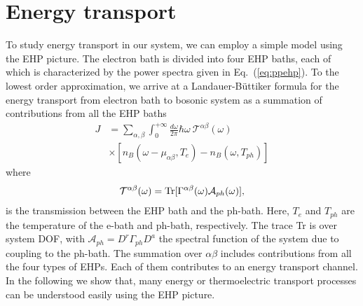 \documentclass[aps
,floatfix,footinbib,
preprint
]{revtex4-1}
\begin{document}
\section{Energy transport}
To study energy transport in our system, we can employ a simple model using the EHP picture. The electron bath is divided into four EHP baths, each of which is characterized by the power spectra given in Eq.~(\ref{eq:ppehp}). 
To the lowest order approximation, we arrive at a Landauer-B\"uttiker formula for the energy transport from electron bath to bosonic system as a summation of contributions from all the EHP baths
\begin{align}
J &= \sum_{\alpha,\beta}\int_0^{+\infty}\frac{d\omega}{2\pi}\hbar\omega\ \mathcal{T}^{\alpha\beta}(\omega)\nonumber\\
&\times [n_B(\omega-\mu_{\alpha\beta},{T}_{e})-n_B(\omega,T_{ph})]
\label{eq:jjtrans}
\end{align}
where
\begin{align}
\mathcal{T}^{\alpha\beta}(\omega)={\rm Tr}[\Gamma^{\alpha\beta}(\omega)\mathcal{A}_{ph}(\omega)],
\end{align}
is the transmission between the EHP bath and the ph-bath. 
Here, $T_e$ and $T_{ph}$ are the temperature of the e-bath and ph-bath, respectively. The trace Tr is over system DOF, with $\mathcal{A}_{ph}=D^r \Gamma_{ph} D^a$ the spectral function of the system due to coupling to the ph-bath. The summation over $\alpha\beta$ includes contributions from all the four types of EHPs. Each of them contributes to an energy transport channel. In the following we show that, many energy or thermoelectric transport processes can be understood easily using the EHP picture.


\end{document}
